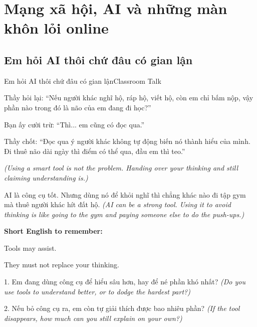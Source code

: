 \chapter{Mạng xã hội, AI và những màn khôn lỏi online}

\section{Em hỏi AI thôi chứ đâu có gian lận}
\begin{truyen}{Em hỏi AI thôi chứ đâu có gian lận}{Classroom Talk}

Thầy hỏi lại: ``Nếu người khác nghĩ hộ, ráp hộ, viết hộ, còn em chỉ bấm nộp, vậy phần nào trong đó là não của em đang đi học?''

Bạn ấy cười trừ: ``Thì... em cũng có đọc qua.''

Thầy chốt: ``Đọc qua ý người khác không tự động biến nó thành hiểu của mình. Đi thuê não dài ngày thì điểm có thể qua, đầu em thì teo.''

\textit{(Using a smart tool is not the problem. Handing over your thinking and still claiming understanding is.)}
\end{truyen}

\begin{baihoc}
AI là công cụ tốt. Nhưng dùng nó để khỏi nghĩ thì chẳng khác nào đi tập gym mà thuê người khác hít đất hộ.
\textit{(AI can be a strong tool. Using it to avoid thinking is like going to the gym and paying someone else to do the push-ups.)}
\end{baihoc}

\begin{ghinhoanh}
\textbf{Short English to remember:}

Tools may assist.

They must not replace your thinking.
\end{ghinhoanh}

\begin{tuhocnhanh}
1. Em đang dùng công cụ để hiểu sâu hơn, hay để né phần khó nhất? \textit{(Do you use tools to understand better, or to dodge the hardest part?)}

2. Nếu bỏ công cụ ra, em còn tự giải thích được bao nhiêu phần? \textit{(If the tool disappears, how much can you still explain on your own?)}
\end{tuhocnhanh}
\ngancach

